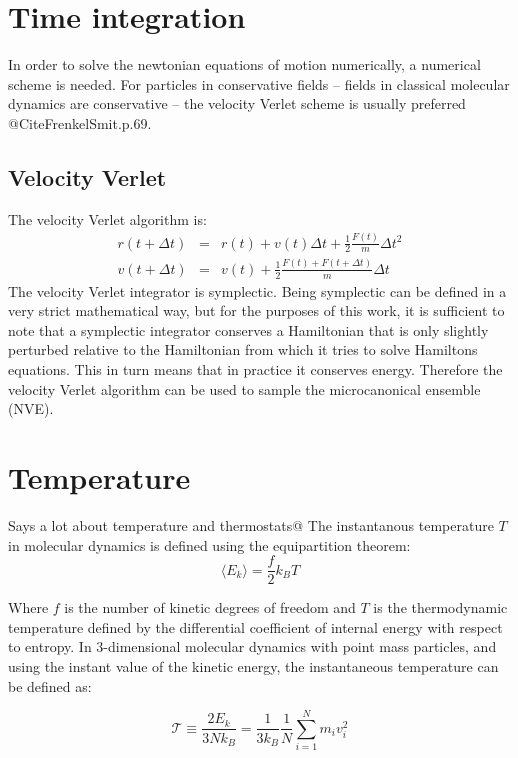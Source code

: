 \section{Time integration}
In order to solve the newtonian equations of motion numerically, a numerical scheme is needed. For particles in conservative fields -- fields in classical molecular dynamics are conservative -- the velocity Verlet scheme is usually preferred @CiteFrenkelSmit.p.69. 

\subsection{Velocity Verlet}
The velocity Verlet algorithm is:
\begin{align}
	r(t+\Delta t) &=& r(t) + v(t)\Delta t + \frac{1}{2}\frac{F(t)}{m}\Delta t^2 \\
	v(t + \Delta t) &=& v(t) + \frac{1}{2} \frac{F(t) + F(t+\Delta t)}{m}\Delta t
\end{align}
The velocity Verlet integrator is symplectic. Being symplectic can be defined in a very strict mathematical way, but for the purposes of this work, it is sufficient to note that a symplectic integrator conserves a Hamiltonian that is only slightly perturbed relative to the Hamiltonian from which it tries to solve Hamiltons equations. This in turn means that in practice it conserves energy. Therefore the velocity Verlet algorithm can be used to sample the microcanonical ensemble (NVE).

\section{Temperature}
\citet{Hunenberger2005} Says a lot about temperature and thermostats@
The instantanous temperature $T$ in molecular dynamics is defined using the equipartition theorem:
\begin{equation}
	\langle E_k \rangle = \frac{f}{2}k_B T
\end{equation}

Where $f$ is the number of kinetic degrees of freedom and $T$ is the thermodynamic temperature defined by the differential coefficient of internal energy with respect to entropy. In 3-dimensional molecular dynamics with point mass particles, and using the instant value of the kinetic energy, the instantaneous temperature can be defined as:

\begin{equation}
	\mathcal{T} \equiv \frac{2E_k}{3 Nk_B} = \frac{1}{3 k_B} \frac{1}{N}\sum_{i=1}^{N} m_iv_i^2
\end{equation}

